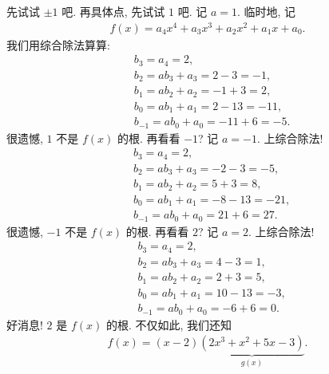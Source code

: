\begin{example}
    先试试 $\pm 1$ 吧. 再具体点, 先试试 $1$ 吧. 记 $a = 1$. 临时地, 记
    \begin{align*}
        f(x) = a_4 x^4 + a_3 x^3 + a_2 x^2 + a_1 x + a_0.
    \end{align*}
    我们用综合除法算算:
    \begin{align*}
         & b_3 = a_4 = 2,                       \\
         & b_2 = a b_3 + a_3 = 2 - 3 = -1,      \\
         & b_1 = a b_2 + a_2 = -1 + 3 = 2,      \\
         & b_0 = a b_1 + a_1 = 2 - 13 = -11,    \\
         & b_{-1} = a b_0 + a_0 = -11 + 6 = -5.
    \end{align*}
    很遗憾, $1$ 不是 $f(x)$ 的根. 再看看 $-1$? 记 $a = -1$. 上综合除法!
    \begin{align*}
         & b_3 = a_4 = 2,                      \\
         & b_2 = a b_3 + a_3 = -2 - 3 = -5,    \\
         & b_1 = a b_2 + a_2 = 5 + 3 = 8,      \\
         & b_0 = a b_1 + a_1 = -8 - 13 = -21,  \\
         & b_{-1} = a b_0 + a_0 = 21 + 6 = 27.
    \end{align*}
    很遗憾, $-1$ 不是 $f(x)$ 的根. 再看看 $2$? 记 $a = 2$. 上综合除法!
    \begin{align*}
         & b_3 = a_4 = 2,                     \\
         & b_2 = a b_3 + a_3 = 4 - 3 = 1,     \\
         & b_1 = a b_2 + a_2 = 2 + 3 = 5,     \\
         & b_0 = a b_1 + a_1 = 10 - 13 = -3,  \\
         & b_{-1} = a b_0 + a_0 = -6 + 6 = 0.
    \end{align*}
    好消息! $2$ 是 $f(x)$ 的根. 不仅如此, 我们还知
    \begin{align*}
        f(x) = (x - 2)\underbrace{(2x^3 + x^2 + 5x - 3)}_{g(x)}.
    \end{align*}


\end{example}
